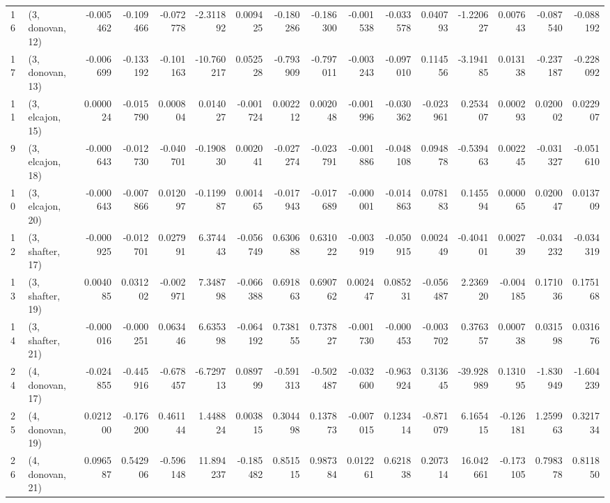 \begin{tabular}{llrrrrrrrrrrrrrr}
16 &  (3, donovan, 12) &  -0.005462 & -0.109466 & -0.072778 &  -2.311892 &  0.009425 &  -0.180286 & -0.186300 & -0.001538 & -0.033578 &  0.040793 &  -1.220627 &  0.007643 & -0.087540 & -0.088192 \\
17 &  (3, donovan, 13) &  -0.006699 & -0.133192 & -0.101163 & -10.760217 &  0.052528 &  -0.793909 & -0.797011 & -0.003243 & -0.097010 &  0.114556 &  -3.194185 &  0.013138 & -0.237187 & -0.228092 \\
11 &  (3, elcajon, 15) &   0.000024 & -0.015790 &  0.000804 &   0.014027 & -0.001724 &   0.002212 &  0.002048 & -0.001996 & -0.030362 & -0.023961 &   0.253407 &  0.000293 &  0.020002 &  0.022907 \\
9  &  (3, elcajon, 18) &  -0.000643 & -0.012730 & -0.040701 &  -0.190830 &  0.002041 &  -0.027274 & -0.023791 & -0.001886 & -0.048108 &  0.094878 &  -0.539463 &  0.002245 & -0.031327 & -0.051610 \\
10 &  (3, elcajon, 20) &  -0.000643 & -0.007866 &  0.012097 &  -0.119987 &  0.001465 &  -0.017943 & -0.017689 & -0.000001 & -0.014863 &  0.078183 &   0.145594 &  0.000065 &  0.020047 &  0.013709 \\
12 &  (3, shafter, 17) &  -0.000925 & -0.012701 &  0.027991 &   6.374443 & -0.056749 &   0.630688 &  0.631022 & -0.003919 & -0.050915 &  0.002449 &  -0.404101 &  0.002739 & -0.034232 & -0.034319 \\
13 &  (3, shafter, 19) &   0.004085 &  0.031202 & -0.002971 &   7.348798 & -0.066388 &   0.691863 &  0.690762 &  0.002447 &  0.085231 & -0.056487 &   2.236920 & -0.004185 &  0.171036 &  0.175168 \\
14 &  (3, shafter, 21) &  -0.000016 & -0.000251 &  0.063446 &   6.635398 & -0.064192 &   0.738155 &  0.737827 & -0.001730 & -0.000453 & -0.003702 &   0.376357 &  0.000738 &  0.031598 &  0.031676 \\
24 &  (4, donovan, 17) &  -0.024855 & -0.445916 & -0.678457 &  -6.729713 &  0.089799 &  -0.591313 & -0.502487 & -0.032600 & -0.963924 &  0.313645 & -39.928989 &  0.131095 & -1.830949 & -1.604239 \\
25 &  (4, donovan, 19) &   0.021200 & -0.176200 &  0.461144 &   1.448824 &  0.003815 &   0.304498 &  0.137873 & -0.007015 &  0.123414 & -0.871079 &   6.165415 & -0.126181 &  1.259963 &  0.321734 \\
26 &  (4, donovan, 21) &   0.096587 &  0.542906 & -0.596148 &  11.894237 & -0.185482 &   0.851515 &  0.987384 &  0.012261 &  0.621838 &  0.207314 &  16.042661 & -0.173105 &  0.798378 &  0.811850 \\

\end{tabular}
